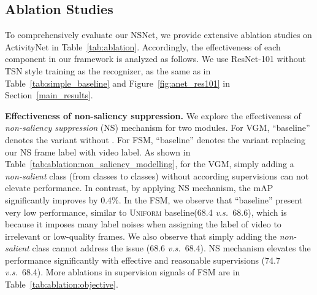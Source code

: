 \documentclass[runningheads]{llncs}
\newcommand{\figref}[1]{Figure~\ref{#1}}
\newcommand{\tabref}[1]{Table~\ref{#1}}
\newcommand{\secref}[1]{Section~\ref{#1}}
\def\vs{\emph{v.s.~}}
\begin{document}
\begin{table*}[t]
\hfill
\begin{subtable}[th]{0.45\textwidth}
\centering
\caption{Results of FS module with different learning objectives.}
\label{tab:ablation:objective}
\renewcommand{\arraystretch}{0.95}
\setlength{\tabcolsep}{6.0pt}
\end{subtable}
\end{table*}
 \subsection{Ablation Studies}
To comprehensively evaluate our NSNet, we provide extensive ablation studies on ActivityNet in \tabref{tab:ablation}. 
Accordingly, the effectiveness of each component in our framework is analyzed as follows. We use ResNet-101 without TSN style training as the recognizer, as the same as in \tabref{tab:simple_baseline} and \figref{fig:anet_res101} in \secref{main_results}.


\noindent\textbf{Effectiveness of non-saliency suppression.} 
We explore the effectiveness of \emph{non-saliency suppression} (NS) mechanism for two modules. For VGM, ``baseline'' denotes the variant without . For FSM, ``baseline'' denotes the variant replacing our NS frame label with video label.  As shown in \tabref{tab:ablation:non_saliency_modelling}, for the VGM, simply adding a \textit{non-salient} class (from  classes to  classes) without according supervisions can not elevate performance. In contrast, by applying NS mechanism, the mAP significantly improves by 0.4\%. In the FSM, we observe that ``baseline'' present very low performance, similar to \textsc{Uniform} baseline(68.4 \vs 68.6), which is because it imposes many label noises when assigning the label of video to irrelevant or low-quality frames. We also observe that simply adding the \emph{non-salient} class cannot address the issue (68.6 \vs 68.4). NS mechanism elevates the performance significantly with effective and reasonable supervisions (74.7 \vs 68.4). More ablations in supervision signals of FSM are in \tabref{tab:ablation:objective}.
\end{document}

